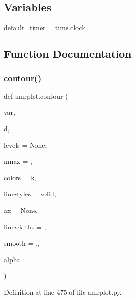 \subsection*{Variables}
\begin{DoxyCompactItemize}
\item 
\hyperlink{namespaceamrplot_a29460b111d807c4745b5a83ec9c4e806}{default\+\_\+timer} = time.\+clock
\end{DoxyCompactItemize}


\subsection{Function Documentation}
\mbox{\label{namespaceamrplot_a6c85688725768d179b09bc02dffca0f3}} 
\subsubsection{\texorpdfstring{contour()}{contour()}}
{\footnotesize\ttfamily def amrplot.\+contour (\begin{DoxyParamCaption}\item[{}]{var,  }\item[{}]{d,  }\item[{}]{levels = {\ttfamily None},  }\item[{}]{nmax = {},  }\item[{}]{colors = {\ttfamily \textquotesingle{}k\textquotesingle{}},  }\item[{}]{linestyles = {\ttfamily \textquotesingle{}solid\textquotesingle{}},  }\item[{}]{ax = {\ttfamily None},  }\item[{}]{linewidths = {},  }\item[{}]{smooth = {.},  }\item[{}]{alpha = {.} }\end{DoxyParamCaption})}



Definition at line 475 of file amrplot.\+py.


